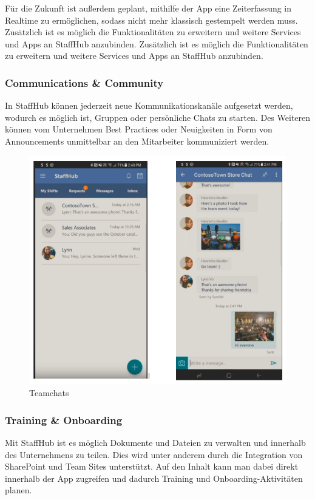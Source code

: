 Für die Zukunft ist außerdem geplant, mithilfe der App eine Zeiterfassung in Realtime zu ermöglichen, sodass nicht mehr klassisch gestempelt werden muss.
Zusätzlich ist es möglich die Funktionalitäten zu erweitern und weitere Services und Apps an StaffHub anzubinden. Zusätzlich ist es möglich die Funktionalitäten zu erweitern und weitere Services und Apps an StaffHub anzubinden.

\subsubsection{Communications \& Community}

In StaffHub können jederzeit neue Kommunikationskanäle aufgesetzt werden, wodurch es möglich ist, Gruppen oder persönliche Chats zu starten. Des Weiteren können vom Unternehmen Best Practices oder Neuigkeiten in Form von Announcements unmittelbar an den Mitarbeiter kommuniziert werden.

\begin{figure}[H] 
\centering 
\includegraphics[scale=0.78]{images/groupchat} 
\caption[Teamchats]{Teamchats\protect} 
\label{ws} 
\end{figure}

\subsubsection{Training \& Onboarding}

Mit StaffHub ist es möglich Dokumente und Dateien zu verwalten und innerhalb des Unternehmens zu teilen. Dies wird unter anderem durch die Integration von SharePoint und Team Sites unterstützt. Auf den Inhalt kann man dabei direkt innerhalb der App zugreifen und dadurch Training und Onboarding-Aktivitäten planen.

